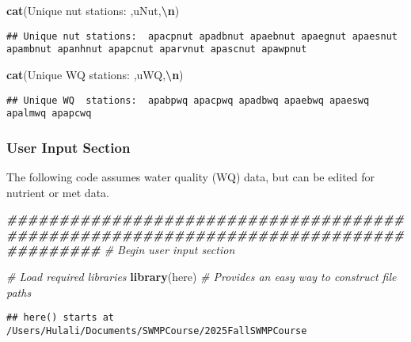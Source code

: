 \documentclass[
]{article}
\newenvironment{Shaded}{\begin{snugshade}}{\end{snugshade}}
\newcommand{\CommentTok}[1]{\textcolor[rgb]{0.56,0.35,0.01}{\textit{#1}}}
\newcommand{\DocumentationTok}[1]{\textcolor[rgb]{0.56,0.35,0.01}{\textbf{\textit{#1}}}}
\newcommand{\FunctionTok}[1]{\textcolor[rgb]{0.13,0.29,0.53}{\textbf{#1}}}
\newcommand{\NormalTok}[1]{#1}
\newcommand{\SpecialCharTok}[1]{\textcolor[rgb]{0.81,0.36,0.00}{\textbf{#1}}}
\newcommand{\StringTok}[1]{\textcolor[rgb]{0.31,0.60,0.02}{#1}}
\begin{document}
\begin{Shaded}
\begin{Highlighting}[]
\FunctionTok{cat}\NormalTok{(}\StringTok{\textquotesingle{}Unique nut stations: \textquotesingle{}}\NormalTok{,uNut,}\StringTok{\textquotesingle{}}\SpecialCharTok{\textbackslash{}n}\StringTok{\textquotesingle{}}\NormalTok{)}
\end{Highlighting}
\end{Shaded}

\begin{verbatim}
## Unique nut stations:  apacpnut apadbnut apaebnut apaegnut apaesnut apambnut apanhnut apapcnut aparvnut apascnut apawpnut
\end{verbatim}

\begin{Shaded}
\begin{Highlighting}[]
\FunctionTok{cat}\NormalTok{(}\StringTok{\textquotesingle{}Unique WQ  stations: \textquotesingle{}}\NormalTok{,uWQ,}\StringTok{\textquotesingle{}}\SpecialCharTok{\textbackslash{}n}\StringTok{\textquotesingle{}}\NormalTok{)}
\end{Highlighting}
\end{Shaded}

\begin{verbatim}
## Unique WQ  stations:  apabpwq apacpwq apadbwq apaebwq apaeswq apalmwq apapcwq
\end{verbatim}

\subsubsection{User Input Section}\label{user-input-section}

The following code assumes water quality (WQ) data, but can be edited
for nutrient or met data.

\begin{Shaded}
\begin{Highlighting}[]
\DocumentationTok{\#\#\#\#\#\#\#\#\#\#\#\#\#\#\#\#\#\#\#\#\#\#\#\#\#\#\#\#\#\#\#\#\#\#\#\#\#\#\#\#\#\#\#\#\#\#\#\#\#\#\#\#\#\#\#\#\#\#\#\#\#\#\#\#\#\#\#\#\#\#\#\#\#\#\#\#\#\#\#\#\#\#\#\#\#}
\CommentTok{\# Begin user input section}

\CommentTok{\# Load required libraries}
\FunctionTok{library}\NormalTok{(here)        }\CommentTok{\# Provides an easy way to construct file paths}
\end{Highlighting}
\end{Shaded}

\begin{verbatim}
## here() starts at /Users/Hulali/Documents/SWMPCourse/2025FallSWMPCourse
\end{verbatim}
\end{document}
